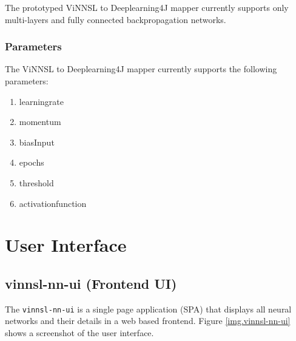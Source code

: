 The prototyped ViNNSL to Deeplearning4J mapper currently supports only
multi-layers and fully connected backpropagation networks.

\subsection{Parameters}\label{parameters}

The ViNNSL to Deeplearning4J mapper currently supports the following
parameters:

\begin{enumerate}
\def\labelenumi{\arabic{enumi}.}
\tightlist
\item
  learningrate
\item
  momentum
\item
  biasInput
\item
  epochs
\item
  threshold
\item
  activationfunction
\end{enumerate}

\chapter{User Interface}\label{user-interface-2}

\section{vinnsl-nn-ui (Frontend UI)}\label{vinnsl-nn-ui-frontend-ui-1}

The \texttt{vinnsl-nn-ui} is a single page application (SPA) that
displays all neural networks and their details in a web based frontend.
Figure \ref{img.vinnsl-nn-ui} shows a screenshot of the user interface.

